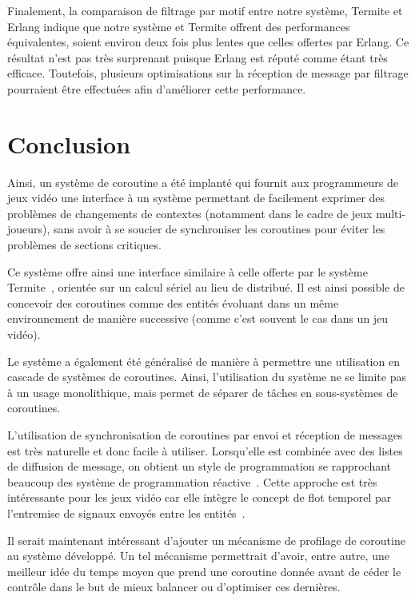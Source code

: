 \documentclass[12pt,twoside,letterpaper,francais]{book}
\begin{document}
Finalement, la comparaison de filtrage par motif entre notre système,
Termite et Erlang indique que notre système et Termite offrent des
performances équivalentes, soient environ deux fois plus lentes que
celles offertes par Erlang. Ce résultat n'est pas très surprenant
puisque Erlang est réputé comme étant très efficace. Toutefois,
plusieurs optimisations sur la réception de message par filtrage
pourraient être effectuées afin d'améliorer cette performance.


\FloatBarrier
\section{Conclusion}
Ainsi, un système de coroutine a été implanté qui fournit aux
programmeurs de jeux vidéo une interface à un système permettant de
facilement exprimer des problèmes de changements de contextes
(notamment dans le cadre de jeux multi-joueurs), sans avoir à se
soucier de synchroniser les coroutines pour éviter les problèmes de
sections critiques.

Ce système offre ainsi une interface similaire à celle offerte par le
système Termite~\cite{Termite_paper}, orientée sur un calcul sériel au
lieu de distribué. Il est ainsi possible de concevoir des coroutines
comme des entités évoluant dans un même environnement de manière
successive (comme c'est souvent le cas dans un jeu vidéo).

Le système a également été généralisé de manière à permettre une
utilisation en cascade de systèmes de coroutines. Ainsi, l'utilisation
du système ne se limite pas à un usage monolithique, mais permet de
séparer de tâches en sous-systèmes de coroutines.

L'utilisation de synchronisation de coroutines par envoi et réception
de messages est très naturelle et donc facile à utiliser. Lorsqu'elle
est combinée avec des listes de diffusion de message, on obtient un
style de programmation se rapprochant beaucoup des système de
programmation réactive~\cite{FRP}. Cette approche est très
intéressante pour les jeux vidéo car elle intègre le concept de flot
temporel par l'entremise de signaux envoyés entre les
entités~\cite{yampa}.

Il serait maintenant intéressant d'ajouter un mécanisme de profilage
de coroutine au système développé. Un tel mécanisme permettrait
d'avoir, entre autre, une meilleur idée du temps moyen que prend une
coroutine donnée avant de céder le contrôle dans le but de mieux
balancer ou d'optimiser ces dernières.
\end{document}
